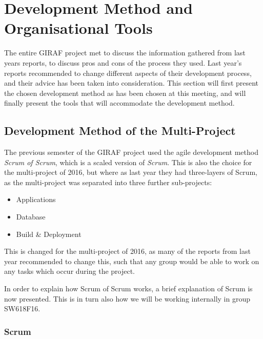 \section{Development Method and Organisational Tools}
The entire GIRAF project met to discuss the information gathered from last years reports, to discuss pros and cons of the process they used.
Last year's reports recommended to change different aspects of their development process, and their advice has been taken into consideration.
This section will first present the chosen development method as has been chosen at this meeting, and will finally present the tools that will accommodate the development method.


\subsection*{Development Method of the Multi-Project}
The previous semester of the GIRAF project used the agile development method \textit{Scrum of Scrum}, which is a scaled version of \textit{Scrum}.
This is also the choice for the multi-project of 2016, but where as last year they had three-layers of Scrum, as the multi-project was separated into three further sub-projects:
\begin{itemize}
	\item Applications
	\item Database
	\item Build \& Deployment
\end{itemize}

This is changed for the multi-project of 2016, as many of the reports from last year recommended to change this, such that any group would be able to work on any tasks which occur during the project. 

In order to explain how Scrum of Scrum works, a brief explanation of Scrum is now presented.
This is in turn also how we will be working internally in group SW618F16. 


\subsubsection*{Scrum}\label{scrum}

